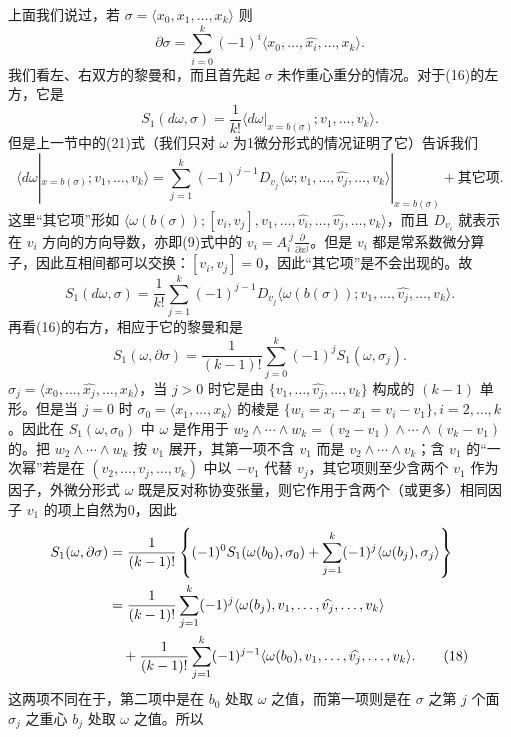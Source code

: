 上面我们说过，若 $\sigma=\langle x_0,x_1,\ldots,x_k\rangle$ 则
\[
 \partial\sigma=\sum_{i=0}^k(-1)^i\langle x_0,\ldots,\widehat{x_i},\ldots,x_k\rangle.
\]
我们看左、右双方的黎曼和，而且首先起 $\sigma$ 未作重心重分的情况。对于(16)的左方，它是
\[
 S_1(d\omega,\sigma)=\frac1{k!}\langle d\omega|_{x=b(\sigma)};v_1,\ldots,v_k\rangle.
\]
但是上一节中的(21)式（我们只对 $\omega$ 为1微分形式的情况证明了它）告诉我们
\[
 \langle d\omega|_{x=b(\sigma)};v_1,\ldots,v_k\rangle
 =\sum_{j=1}^k(-1)^{j-1}D_{v_j}\langle\omega;v_1,\ldots,\widehat{v_j},\ldots,v_k\rangle|_{x=b(\sigma)}+\text{其它项}.
\]
这里“其它项”形如 $\langle\omega(b(\sigma));[v_i,v_j],v_1,\ldots,\widehat{v_i},\ldots,\widehat{v_j},\ldots,v_k\rangle$，而且 $D_{v_i}$ 就表示在 $v_i$ 方向的方向导数，亦即(9)式中的 $v_i=A_i^{\ j}\frac{\partial}{\partial x^j}$。但是 $v_i$ 都是常系数微分算子，因此互相间都可以交换：$[v_i,v_j]=0$，因此“其它项”是不会出现的。故
\begin{equation}
 S_1(d\omega,\sigma)
 =\frac1{k!}\sum_{j=1}^k(-1)^{j-1}D_{v_j}
 \langle\omega(b(\sigma));v_1,\ldots,\widehat{v_j},\ldots,v_k\rangle.
 \tag{17}
\end{equation}
再看(16)的右方，相应于它的黎曼和是
\[
 S_1(\omega,\partial\sigma)=\frac1{(k-1)!}\sum_{j=0}^k(-1)^jS_1(\omega,\sigma_j).
\]
$\sigma_j=\langle x_0,\ldots,\widehat{x_j},\ldots,x_k\rangle$，当 $j>0$ 时它是由 $\{v_1,\ldots,\widehat{v_j},\ldots,v_k\}$ 构成的 $(k-1)$ 单形。但是当 $j=0$ 时 $\sigma_0=\langle x_1,\ldots,x_k\rangle$ 的棱是 $\{w_i=x_i-x_1=v_i-v_1\},i=2,\ldots,k$。因此在 $S_1(\omega,\sigma_0)$ 中 $\omega$ 是作用于 $w_2\wedge\cdots\wedge w_k=(v_2-v_1)\wedge\cdots\wedge(v_k-v_1)$ 的。把 $w_2\wedge\cdots\wedge w_k$ 按 $v_1$ 展开，其第一项不含 $v_1$ 而是 $v_2\wedge\cdots\wedge v_k$；含 $v_1$ 的“一次幂”若是在 $(v_2,\ldots,v_j,\ldots,v_k)$ 中以 $-v_1$ 代替 $v_j$，其它项则至少含两个 $v_1$ 作为因子，外微分形式 $\omega$ 既是反对称协变张量，则它作用于含两个（或更多）相同因子 $v_1$ 的项上自然为0，因此
\begin{align}
 S_1(\omega,\partial\sigma)
 &=\frac1{(k-1)!}\left\{(-1)^0S_1(\omega(b_0),\sigma_0)+\sum_{j=1}^k(-1)^j\langle\omega(b_j),\sigma_j\rangle\right\}\notag\\
 &=\frac1{(k-1)!}\sum_{j=1}^k(-1)^j\langle\omega(b_j),v_1,\ldots,\widehat{v_j},\ldots,v_k\rangle\\
 &\quad+\frac1{(k-1)!}\sum_{j=1}^k(-1)^{j-1}\langle\omega(b_0),v_1,\ldots,\widehat{v_j},\ldots,v_k\rangle.
 \tag{18}
\end{align}
这两项不同在于，第二项中是在 $b_0$ 处取 $\omega$ 之值，而第一项则是在 $\sigma$ 之第 $j$ 个面 $\sigma_j$ 之重心 $b_j$ 处取 $\omega$ 之值。所以
